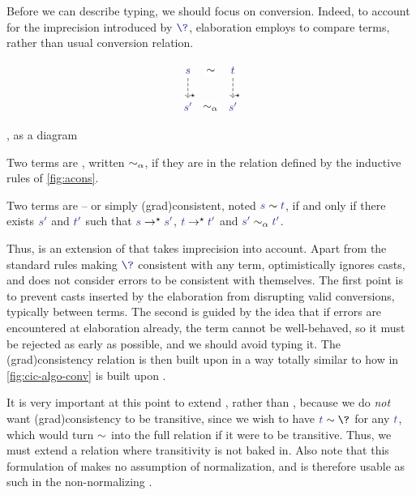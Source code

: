 Before we can describe typing, we should focus on conversion. Indeed, to account for the imprecision introduced by $\tcol{\?}$, elaboration employs 
to compare  terms, rather than usual conversion relation.

\begin{marginfigure}[4em]
  \[\begin{tikzcd}
    \tcol{s} \arrow[d, dashed, "\star" very near end] \arrow[r, phantom, "\cons" description] &
    \tcol{t} \arrow[d, dashed, "\star" very near end] \\
    \tcol{s'} \arrow[r,phantom,"\acons" description] & \tcol{s'}
  \end{tikzcd}\]
  \caption{, as a diagram}
\end{marginfigure}

\begin{definition}
	\label{def:cons}
	Two  terms are , written $\sim_{\alpha}$,
  if they are in the relation defined by the inductive rules of \cref{fig:acons}.

	Two terms are  – or simply \reintro(grad){consistent},
  noted $\tcol{s} \cons \tcol{t}$, if and only if there exists $\tcol{s'}$ and $\tcol{t'}$ such that $\tcol{s} \red \tcol{s'}$, $\tcol{t} \red \tcol{t'}$ and $\tcol{s'} \acons \tcol{t'}$.
\end{definition}

Thus,  is an extension of  that takes imprecision into account.
Apart from the standard rules making $\tcol{\?}$ consistent with any term,
 optimistically ignores casts,
and does not consider errors to be consistent with themselves.
The first point is to prevent casts inserted by the elaboration from disrupting valid
conversions, typically between  terms.
The second is guided by the idea that if errors are encountered at elaboration already,
the term cannot be well-behaved,
so it must be rejected as early as possible, and we should avoid typing it.
The \kl(grad){consistency} relation is then built upon  in a way totally similar to
how  in \cref{fig:cic-algo-conv} is built upon .

It is very important at this point to extend , rather than
, because we do \emph{not} want \kl(grad){consistency}
to be transitive,
since we wish to have $\tcol{t} \cons \?$ for any $\tcol{t}$, which would turn $\sim$ into
the full relation if it were to be transitive. Thus, we must extend a relation where
transitivity is not baked in.
Also note that this formulation of  makes no assumption of
normalization, and is therefore usable as such in the non-normalizing .

